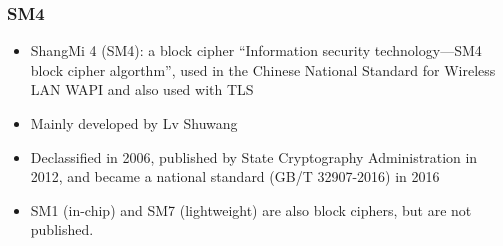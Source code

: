 \begin{frame}\frametitle{SM4}
\begin{itemize}
	\item ShangMi 4 (SM4): a block cipher ``Information security technology—SM4 block cipher algorthm'', used in the Chinese National Standard for Wireless LAN WAPI and also used with TLS
	\item Mainly developed by Lv Shuwang
	\item Declassified in 2006, published by State Cryptography Administration in 2012, and became a national standard (GB/T 32907-2016) in 2016
	\item SM1 (in-chip) and SM7 (lightweight) are also block ciphers, but are not published.
\end{itemize}
\end{frame}
